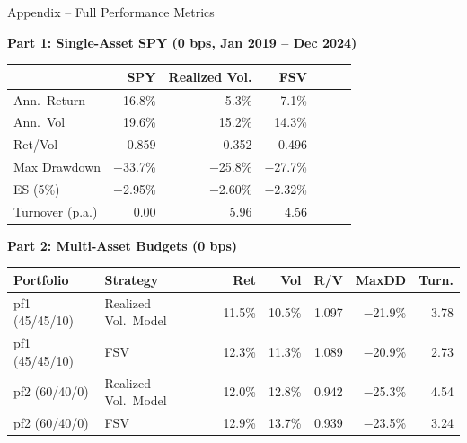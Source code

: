 \documentclass[10pt]{beamer}\usepackage[]{graphicx}\usepackage[table]{xcolor}
\begin{document}
\begin{frame}{Appendix -- Full Performance Metrics}

  \vspace{0.3em}
  {\footnotesize \textbf{Part 1: Single-Asset SPY (0 bps, Jan 2019 -- Dec 2024)}}

  \vspace{0.2em}
  {\footnotesize
  \begin{tabular}{@{}lrrrrrr@{}}
    \toprule
    & \textbf{SPY} & \textbf{Realized Vol.} & \textbf{FSV} \\
    \midrule
    Ann.\ Return     & 16.8\% & 5.3\%  & 7.1\% \\
    Ann.\ Vol        & 19.6\% & 15.2\% & 14.3\% \\
    Ret/Vol          & 0.859  & 0.352  & 0.496 \\
    Max Drawdown     & $-$33.7\% & $-$25.8\% & $-$27.7\% \\
    ES (5\%)         & $-$2.95\% & $-$2.60\% & $-$2.32\% \\
    Turnover (p.a.)  & 0.00 & 5.96 & 4.56 \\
    \bottomrule
  \end{tabular}
  }

  \vspace{0.6em}
  {\footnotesize \textbf{Part 2: Multi-Asset Budgets (0 bps)}}

  \vspace{0.2em}
  {\footnotesize
  \setlength{\tabcolsep}{4pt}
  \begin{tabular}{@{}llrrrrr@{}}
    \toprule
    \textbf{Portfolio} & \textbf{Strategy} & \textbf{Ret} & \textbf{Vol} & \textbf{R/V} & \textbf{MaxDD} & \textbf{Turn.} \\
    \midrule
    pf1 (45/45/10) & Realized Vol.\ Model & 11.5\% & 10.5\% & 1.097 & $-$21.9\% & 3.78 \\
    pf1 (45/45/10) & FSV                 & 12.3\% & 11.3\% & 1.089 & $-$20.9\% & 2.73 \\
    \midrule
    pf2 (60/40/0)  & Realized Vol.\ Model & 12.0\% & 12.8\% & 0.942 & $-$25.3\% & 4.54 \\
    pf2 (60/40/0)  & FSV                 & 12.9\% & 13.7\% & 0.939 & $-$23.5\% & 3.24 \\
    \bottomrule
  \end{tabular}
  }

\end{frame}

\end{document}
